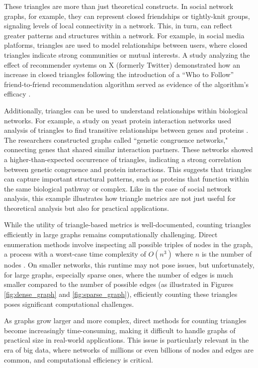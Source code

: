 \documentclass[11pt]{article}
\begin{document}
These triangles are more than just theoretical constructs.
In social network graphs, for example, they can represent closed friendships or tightly-knit groups, signaling levels of local connectivity in a network.
This, in turn, can reflect greater patterns and structures within a network.
For example, in social media platforms, triangles are used to model relationships between users, where closed triangles indicate strong communities or mutual interests.
A study analyzing the effect of recommender systems on X (formerly Twitter) demonstrated how an increase in closed triangles following the introduction of a ``Who to Follow'' friend-to-friend recommendation algorithm served as evidence of the algorithm's efficacy \cite{su_effect_2016}.

Additionally, triangles can be used to understand relationships within biological networks.
For example, a study on yeast protein interaction networks used analysis of triangles to find transitive relationships between genes and proteins \cite{ye_commensurate_2005}.
The researchers constructed graphs called ``genetic congruence networks," connecting genes that shared similar interaction partners.
These networks showed a higher-than-expected occurrence of triangles, indicating a strong correlation between genetic congruence and protein interactions.
This suggests that triangles can capture important structural patterns, such as proteins that function within the same biological pathway or complex.
Like in the case of social network analysis, this example illustrates how triangle metrics are not just useful for theoretical analysis but also for practical applications.

While the utility of triangle-based metrics is well-documented, counting triangles efficiently in large graphs remains computationally challenging.
Direct enumeration methods involve inspecting all possible triples of nodes in the graph, a process with a worst-case time complexity of $O(n^3)$ where $n$ is the number of nodes \cite{al_hasan_triangle_2018}.
On smaller networks, this runtime may not pose issues, but unfortunately, for large graphs, especially sparse ones, where the number of edges is much smaller compared to the number of possible edges (as illustrated in Figures \ref{fig:dense_graph} and \ref{fig:sparse_graph}), efficiently counting these triangles poses significant computational challenges.

As graphs grow larger and more complex, direct methods for counting triangles become increasingly time-consuming, making it difficult to handle graphs of practical size in real-world applications.
This issue is particularly relevant in the era of big data, where networks of millions or even billions of nodes and edges are common, and computational efficiency is critical.
\end{document}
